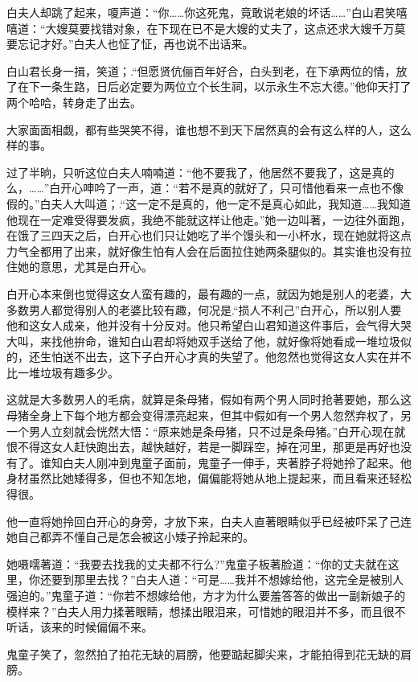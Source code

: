 \documentclass[12pt,oneside]{book}
\begin{document}
白夫人却跳了起来，嗄声道：``你\ldots\ldots 你这死鬼，竟敢说老娘的坏话\ldots\ldots{}''白山君笑嘻嘻道：``大嫂莫要找错对象，在下现在已不是大嫂的丈夫了，这点还求大嫂千万莫要忘记才好。''白夫人也怔了怔，再也说不出话来。

白山君长身一揖，笑道；.``但愿贤伉俪百年好合，白头到老，在下承两位的情，放了在下一条生路，日后必定要为两位立个长生祠，以示永生不忘大德。''他仰天打了两个哈哈，转身走了出去。

大家面面相觑，都有些哭笑不得，谁也想不到天下居然真的会有这么样的人，这么样的事。

过了半晌，只听这位白夫人喃喃道：``他不要我了，他居然不要我了，这是真的么，\ldots\ldots{}''白开心呻吟了一声，道：``若不是真的就好了，只可惜他看来一点也不像假的。''白夫人大叫道；.``这一定不是真的，他一定不是真心如此，我知道\ldots\ldots 我知道他现在一定难受得要发疯，我绝不能就这样让他走。''她一边叫著，一边往外面跑，在饿了三四天之后，白开心也们只让她吃了半个馒头和一小杯水，现在她就将这点力气全都用了出来，就好像生怕有人会在后面拉住她两条腿似的。其实谁也没有拉住她的意思，尤其是白开心。

白开心本来倒也觉得这女人蛮有趣的，最有趣的一点，就因为她是别人的老婆，大多数男人都觉得别人的老婆比较有趣，何况是.``损人不利己''白开心，所以别人要他和这女人成亲，他并没有十分反对。他只希望白山君知道这件事后，会气得大哭大叫，来找他拚命，谁知白山君却将她双手送给了他，就好像将她看成一堆垃圾似的，还生怕送不出去，这下子白开心才真的失望了。他忽然也觉得这女人实在并不比一堆垃圾有趣多少。

这就是大多数男人的毛病，就算是条母猪，假如有两个男人同时抢著要她，那么这母猪全身上下每个地方都会变得漂亮起来，但其中假如有一个男人忽然弃权了，另一个男人立刻就会恍然大悟：``原来她是条母猪，只不过是条母猪。''白开心现在就恨不得这女人赶快跑出去，越快越好，若是一脚踩空，掉在河里，那更是再好也没有了。谁知白夫人刚冲到鬼童子面前，鬼童子一伸手，夹著脖子将她拎了起来。他身材虽然比她矮得多，但也不知怎地，偏偏能将她从地上提起来，而且看来还轻松得很。

他一直将她拎回白开心的身旁，才放下来，白夫人直著眼睛似乎已经被吓呆了己连她自己都弄不懂自己是怎会被这小矮子拎起来的。

她嗫嚅著道：``我要去找我的丈夫都不行么?''鬼童子板著脸道：``你的丈夫就在这里，你还要到那里去找？''白夫人道：``可是\ldots\ldots 我并不想嫁给他，这完全是被别人强迫的。''鬼童子道：``你若不想嫁给他，方才为什么要羞答答的做出一副新娘子的模样来？''白夫人用力揉著眼睛，想揉出眼泪来，可惜她的眼泪并不多，而且很不听话，该来的时候偏偏不来。

鬼童子笑了，忽然拍了拍花无缺的肩膀，他要踮起脚尖来，才能拍得到花无缺的肩膀。
\end{document}
